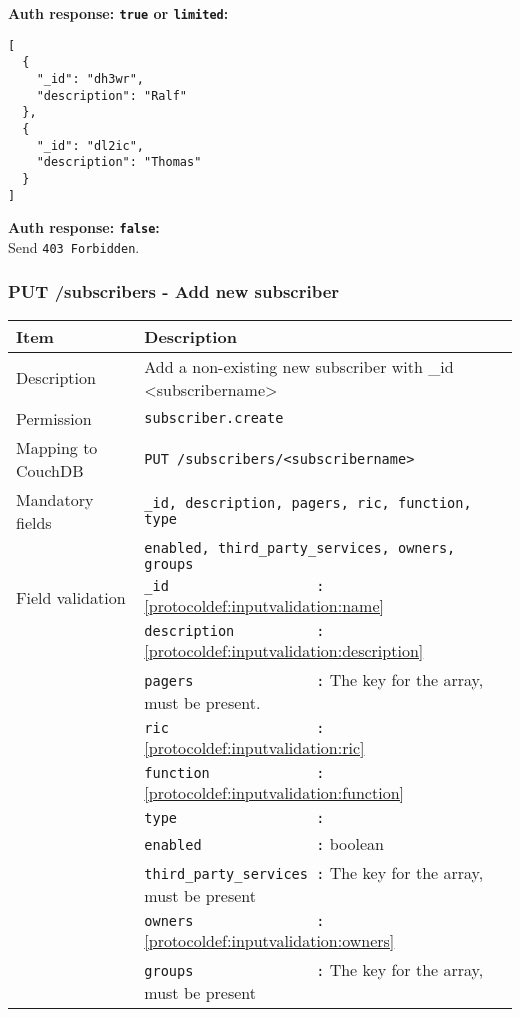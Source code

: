 \textbf{Auth response: \texttt{true} or \texttt{limited}:}\\
\begin{lstlisting}
[
  {
    "_id": "dh3wr",
    "description": "Ralf"
  },
  {
    "_id": "dl2ic",
    "description": "Thomas"
  }
]
\end{lstlisting}

\textbf{Auth response: \texttt{false}:}\\
Send \verb|403 Forbidden|.

\newpage
\subsubsection{PUT /subscribers - Add new subscriber}
\begin{table}[htbp]
  \begin{tabular}{|l|p{12cm}|} \hline
    Item               & Description  \\ \hline \hline
    Description        & Add a non-existing new subscriber with \_id <subscribername>\\ \hline
    Permission         & \verb|subscriber.create| \\ \hline
    Mapping to CouchDB & \verb|PUT /subscribers/<subscribername>|\\ \hline
    Mandatory fields   & \verb|_id, description, pagers, ric, function, type| \\
                       & \verb|enabled, third_party_services, owners, groups| \\ \hline
    Field validation   & \verb|_id                  :| \ref{protocoldef:inputvalidation:name} \\
                       & \verb|description          :| \ref{protocoldef:inputvalidation:description}\\
                       & \verb|pagers               :| The key for the array, must be present.\\
                       & \verb|ric                  :| \ref{protocoldef:inputvalidation:ric} \\
                       & \verb|function             :| \ref{protocoldef:inputvalidation:function} \\
                       & \verb|type                 :|  \\
                       & \verb|enabled              :|  boolean \\
                       & \verb|third_party_services :| The key for the array, must be present \\
                       & \verb|owners               :| \ref{protocoldef:inputvalidation:owners} \\
                       & \verb|groups               :| The key for the array, must be present \\ \hline
  \end{tabular}
\end{table}

